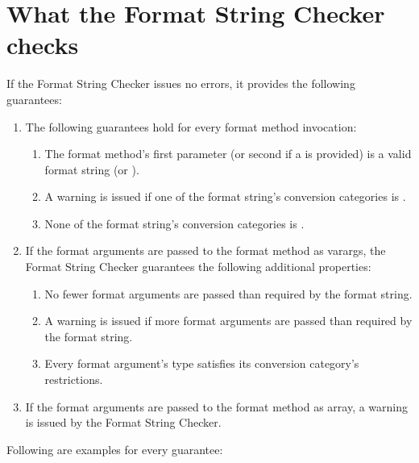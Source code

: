 \section{What the Format String Checker checks\label{formatter-guarantees}}

If the Format String Checker issues no errors, it provides the following guarantees:

\begin{enumerate}
\item
The following guarantees hold for every format method invocation:

\begin{enumerate} 
    \item The format method's first parameter (or second if a  is provided) is a valid 
        format string (or ).

    \item A warning is issued if one of the format string's conversion categories is .
        \label{formatter-unused-category-warning}
    \item None of the format string's conversion categories is .
        \label{formatter-null-category-error}
\end{enumerate} 

\item If the format arguments are passed to the format method as varargs, the
Format String Checker guarantees the following additional properties:

\begin{enumerate} 
\item No fewer format arguments are passed than required by the format string.
\item A warning is issued if more format arguments are passed than required by the format string.
\item Every format argument's type satisfies its conversion category's restrictions.
\end{enumerate}

\item If the format arguments are passed to the format method as array, 
a warning is issued by the Format String Checker.
        \label{formatter-array-warning}
\end{enumerate}


\noindent Following are examples for every guarantee:

